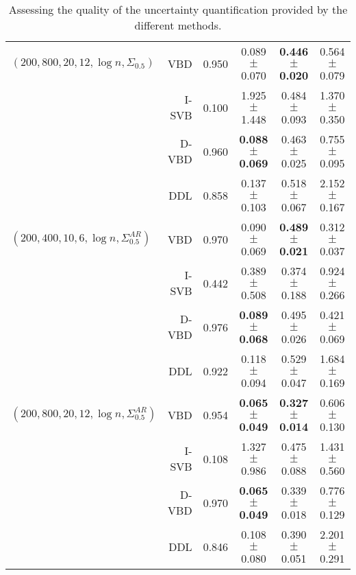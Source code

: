 \documentclass[11pt]{article}
\begin{document}
\begin{table}
{\begin{tabular}{l|r|c|ccc}
                                                    \hline
$(200 , 800 , 20 , 12 , \log n, \Sigma_{0.5})$      & VBD    & 0.950 & 0.089  $\pm$  0.070          & \textbf{0.446  $\pm$  0.020} & 0.564  $\pm$  0.079\\
                                                    & I-SVB  & 0.100 & 1.925  $\pm$  1.448          & 0.484  $\pm$  0.093 & 1.370  $\pm$  0.350\\
                                                    & D-VBD & 0.960 & \textbf{0.088  $\pm$  0.069} & 0.463  $\pm$  0.025 & 0.755  $\pm$  0.095\\
                                                    & DDL    & 0.858 & 0.137  $\pm$  0.103          & 0.518  $\pm$  0.067 & 2.152  $\pm$  0.167\\
                                                    \hline
$(200 , 400 , 10 , 6 , \log n, \Sigma^{AR}_{0.5})$ & VBD    & 0.970 & 0.090  $\pm$  0.069          & \textbf{0.489  $\pm$  0.021} & 0.312  $\pm$  0.037\\
                                                    & I-SVB  & 0.442 & 0.389  $\pm$  0.508          & 0.374  $\pm$  0.188 & 0.924  $\pm$  0.266\\
                                                    & D-VBD & 0.976 & \textbf{0.089  $\pm$  0.068} & 0.495  $\pm$  0.026 & 0.421  $\pm$  0.069\\
                                                    & DDL    & 0.922 & 0.118  $\pm$  0.094          & 0.529  $\pm$  0.047 & 1.684  $\pm$  0.169\\
                                                    \hline
$(200 , 800 , 20 , 12 , \log n, \Sigma^{AR}_{0.5})$ & VBD    & 0.954 & \textbf{0.065  $\pm$  0.049} & \textbf{0.327  $\pm$  0.014} & 0.606  $\pm$  0.130\\
                                                    & I-SVB  & 0.108 & 1.327  $\pm$  0.986          & 0.475  $\pm$  0.088 & 1.431  $\pm$  0.560\\
                                                    & D-VBD & 0.970 & \textbf{0.065  $\pm$  0.049} & 0.339  $\pm$  0.018 & 0.776  $\pm$  0.129\\
                                                    & DDL    & 0.846 & 0.108  $\pm$  0.080          & 0.390  $\pm$  0.051 & 2.201  $\pm$  0.291\\
\bottomrule
\end{tabular}
}
\caption{Assessing the quality of the uncertainty quantification provided by the different methods.}
\label{Tab:double_debiasing_results}
\end{table}
\end{document}

